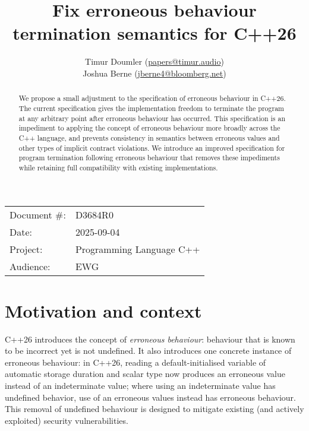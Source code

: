 

 \usepackage[bottom]{footmisc} 



\title{Fix erroneous behaviour termination semantics for C++26}
\author{
  Timur Doumler \small(\href{mailto:papers@timur.audio}{papers@timur.audio}) \\
  Joshua Berne \small(\href{mailto:jberne4@bloomberg.net}{jberne4@bloomberg.net}) 
}
\date{}
\maketitle

\begin{tabular}{ll}
Document \#: & D3684R0 \\
Date: &2025-09-04 \\
Project: & Programming Language C++ \\
Audience: & EWG
\end{tabular}

\begin{abstract}
We propose a small adjustment to the specification of erroneous behaviour in C++26. The current specification gives the implementation  freedom to terminate the program at any arbitrary point after erroneous behaviour has occurred. This specification is an impediment to applying the concept of erroneous behaviour more broadly across the C++ language, and prevents consistency in semantics between erroneous values and other types of implicit contract violations. We introduce an improved specification for program termination following erroneous behaviour that removes these impediments while retaining full compatibility with existing implementations.
\end{abstract}


\section{Motivation and context}

C++26 introduces the concept of \emph{erroneous behaviour}: behaviour that is known to be incorrect yet is not undefined. It also introduces one concrete instance of erroneous behaviour: in C++26, reading a default-initialised variable of automatic storage duration and scalar type now produces an erroneous value instead of an indeterminate value; where using an indeterminate value has undefined behavior, use of an erroneous values instead has erroneous behaviour. This removal of undefined behaviour is designed to mitigate existing (and actively exploited) security vulnerabilities.

